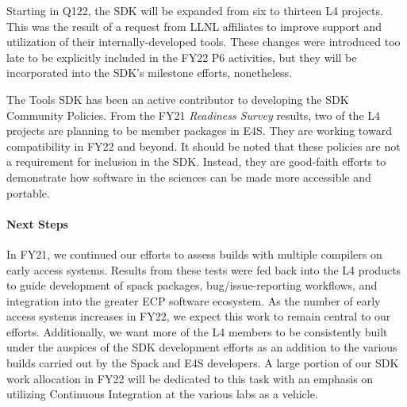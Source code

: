 Starting in Q122, the SDK will be expanded from six to thirteen L4 projects. This was the result of a request from LLNL affiliates to improve support and utilization of their internally-developed tools. These changes were introduced too late to be explicitly included in the FY22 P6 activities, but they will be incorporated into the SDK's milestone efforts, nonetheless.

The Tools SDK has been an active contributor to developing the SDK Community Policies. From the FY21 \textit{Readiness Survey} results, two of the L4 projects are planning to be member packages in E4S. They are working toward compatibility in FY22 and beyond. It should be noted that these policies are not a requirement for inclusion in the SDK. Instead, they are good-faith efforts to demonstrate how software in the sciences can be made more accessible and portable.

\paragraph{Next Steps}
In FY21, we continued our efforts to assess builds with multiple compilers on early access systems. Results from these tests were fed back into the L4 products to guide development of spack packages, bug/issue-reporting workflows, and integration into the greater ECP software ecosystem. As the number of early access systems increases in FY22, we expect this work to remain central to our efforts. Additionally, we want more of the L4 members to be consistently built under the auspices of the SDK development efforts as an addition to the various builds carried out by the Spack and E4S developers. A large portion of our SDK work allocation in FY22 will be dedicated to this task with an emphasis on utilizing Continuous Integration at the various labs as a vehicle.
